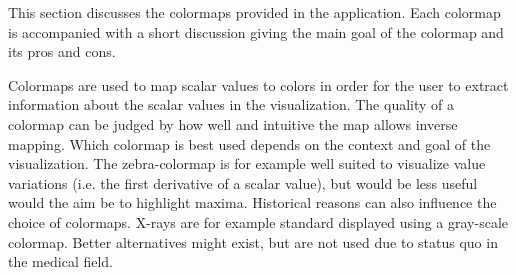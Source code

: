 This section discusses the colormaps provided in the application. Each colormap is accompanied with a short discussion giving the main goal of the colormap and its pros and cons.

Colormaps are used to map scalar values to colors in order for the user to extract information about the scalar values in the visualization. The quality of a colormap can be judged by how well and intuitive the map allows inverse mapping. Which colormap is best used depends on the context and goal of the visualization. The zebra-colormap is for example well suited to visualize value variations (i.e. the first derivative of a scalar value), but would be less useful would the aim be to highlight maxima. Historical reasons can also influence the choice of colormaps. X-rays are for example standard displayed using a gray-scale colormap. Better alternatives might exist, but are not used due to status quo in the medical field.


